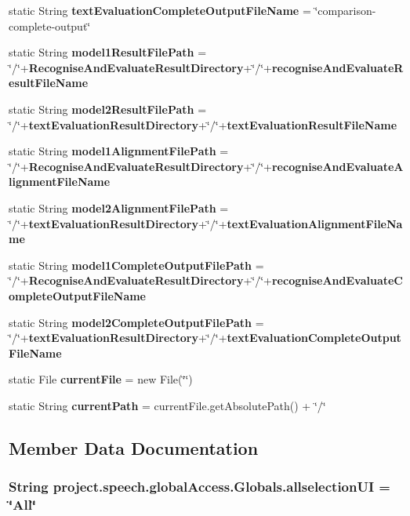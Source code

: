 \begin{DoxyCompactItemize}
static String {\bf text\+Evaluation\+Complete\+Output\+File\+Name} = \char`\"{}comparison-\/complete-\/output\char`\"{}
\item 
static String {\bf model1\+Result\+File\+Path} = \char`\"{}/\char`\"{}+{\bf Recognise\+And\+Evaluate\+Result\+Directory}+\char`\"{}/\char`\"{}+{\bf recognise\+And\+Evaluate\+Result\+File\+Name}
\item 
static String {\bf model2\+Result\+File\+Path} = \char`\"{}/\char`\"{}+{\bf text\+Evaluation\+Result\+Directory}+\char`\"{}/\char`\"{}+{\bf text\+Evaluation\+Result\+File\+Name}
\item 
static String {\bf model1\+Alignment\+File\+Path} = \char`\"{}/\char`\"{}+{\bf Recognise\+And\+Evaluate\+Result\+Directory}+\char`\"{}/\char`\"{}+{\bf recognise\+And\+Evaluate\+Alignment\+File\+Name}
\item 
static String {\bf model2\+Alignment\+File\+Path} = \char`\"{}/\char`\"{}+{\bf text\+Evaluation\+Result\+Directory}+\char`\"{}/\char`\"{}+{\bf text\+Evaluation\+Alignment\+File\+Name}
\item 
static String {\bf model1\+Complete\+Output\+File\+Path} = \char`\"{}/\char`\"{}+{\bf Recognise\+And\+Evaluate\+Result\+Directory}+\char`\"{}/\char`\"{}+{\bf recognise\+And\+Evaluate\+Complete\+Output\+File\+Name}
\item 
static String {\bf model2\+Complete\+Output\+File\+Path} = \char`\"{}/\char`\"{}+{\bf text\+Evaluation\+Result\+Directory}+\char`\"{}/\char`\"{}+{\bf text\+Evaluation\+Complete\+Output\+File\+Name}
\item 
static File {\bf current\+File} = new File(\char`\"{}\char`\"{})
\item 
static String {\bf current\+Path} = current\+File.\+get\+Absolute\+Path() + \char`\"{}/\char`\"{}
\end{DoxyCompactItemize}


\subsection{Member Data Documentation}
\subsubsection[{allselection\+U\+I}]{\setlength{\rightskip}{0pt plus 5cm}String project.\+speech.\+global\+Access.\+Globals.\+allselection\+U\+I = \char`\"{}All\char`\"{}\hspace{0.3cm}{\ttfamily [static]}}\label{classproject_1_1speech_1_1global_access_1_1_globals_a8b4f640bfa5aacbac67d6df6ef2daf37}
